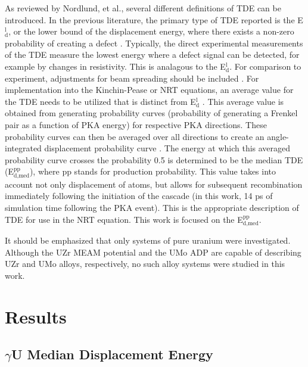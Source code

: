 \documentclass[review]{elsarticle}
\begin{document}
As reviewed by Nordlund, et al.\cite{nordlund2006}, several different definitions of TDE can be introduced. In the previous literature, the primary type of TDE reported is the E$^{\textrm{l}}_{\textrm{d}}$, or the lower bound of the displacement energy, where there exists a non-zero probability of creating a defect \cite{malerba2002}. Typically, the direct experimental measurements of the TDE measure the lowest energy where a defect signal can be detected, for example by changes in resistivity. This is analagous to the E$^{\textrm{l}}_{\textrm{d}}$. For comparison to experiment, adjustments for beam spreading should be included \cite{nordlund2006}. For implementation into the Kinchin-Pease or NRT equations, an average value for the TDE needs to be utilized that is distinct from E$^{\textrm{l}}_{\textrm{d}}$ \cite{nordlund2006,norgett1975}. This average value is obtained from generating probability curves (probability of generating a Frenkel pair as a function of PKA energy) for respective PKA directions. These probability curves can then be averaged over all directions to create an angle-integrated displacement probability curve \cite{nordlund2006}. The energy at which this averaged probability curve crosses the probability 0.5 is determined to be the median TDE (E$^{\textrm{pp}}_{\textrm{d,med}}$), where pp stands for production probability. This value takes into account not only displacement of atoms, but allows for subsequent recombination immediately following the initiation of the cascade (in this work, 14 ps of simulation time following the PKA event). This is the appropriate description of TDE for use in the NRT equation. This work is focused on the E$^{\textrm{pp}}_{\textrm{d,med}}$.

It should be emphasized that only systems of pure uranium were investigated. Although the UZr MEAM potential and the UMo ADP are capable of describing UZr and UMo alloys, respectively, no such alloy systems were studied in this work. 

\section{Results}
\subsection{$\gamma$U Median Displacement Energy}
\end{document}
